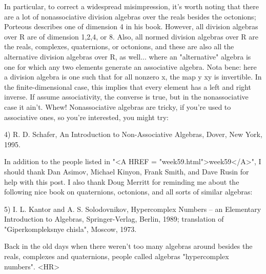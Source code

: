 In particular, to correct a widespread misimpression, it's worth noting
that there are a lot of nonassociative division algebras over the reals
besides the octonions; Porteous describes one of dimension 4 in his
book.  However, all division algebras over R are of dimension 1,2,4, or
8.  Also, all normed division algebras over R are the reals, complexes,
quaternions, or octonions, and these are also all the alternative
division algebras over R, as well... where an "alternative" algebra is
one for which any two elements generate an associative algebra.  Nota
bene: here a division algebra is one such that for all nonzero x, the
map y \to  xy is invertible.  In the finite-dimensional case, this implies
that every element has a left and right inverse.  If assume
associativity, the converse is true, but in the nonassociative case it
ain't.  Whew!  Nonassociative algebras are tricky, if you're used to
associative ones, so you're interested, you might try:

4) R. D. Schafer, An Introduction to Non-Associative Algebras,
Dover, New York, 1995.

In addition to the people listed in "<A HREF = "week59.html">week59</A>", I should thank Dan
Asimov, Michael Kinyon, Frank Smith, and Dave Rusin for help with this post.
I also thank Doug Merritt for reminding me about the following nice
book on quaternions, octonions, and all sorts of similar algebras:

5) I. L. Kantor and A. S. Solodovnikov, Hypercomplex Numbers -- an
Elementary Introduction to Algebras, Springer-Verlag, Berlin, 1989; translation of "Giperkompleksnye chisla", Moscow, 1973.
  
Back in the old days when there weren't too many algebras around 
besides the reals, complexes and quaternions, people called algebras
"hypercomplex numbers".
<HR>



